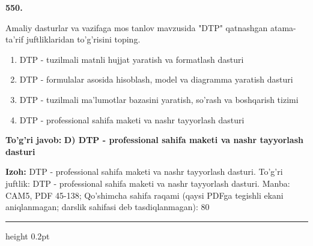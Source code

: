 \documentclass[10pt,a4paper]{article}
\begin{document}
{\bfseries\sffamily\color{ink} 550.}
\par
Amaliy dasturlar va vazifaga mos tanlov mavzusida "DTP" qatnashgan atama-ta'rif juftliklaridan to'g'risini toping.
\begin{enumerate}[label=\Alph*),leftmargin=9mm]
\item DTP - tuzilmali matnli hujjat yaratish va formatlash dasturi
\item DTP - formulalar asosida hisoblash, model va diagramma yaratish dasturi
\item DTP - tuzilmali ma'lumotlar bazasini yaratish, so'rash va boshqarish tizimi
\item DTP - professional sahifa maketi va nashr tayyorlash dasturi
\end{enumerate}
\begin{tcolorbox}[enhanced,breakable,colback=teal!4,colframe=teal!60!black,boxrule=0.45pt,arc=1.2mm,left=2.7mm,right=2.7mm,top=1.8mm,bottom=1.8mm,before skip=2mm,after skip=2mm]
{\bfseries\sffamily\color{teal}To'g'ri javob:} \textbf{D) DTP - professional sahifa maketi va nashr tayyorlash dasturi}
\par\smallskip
{\bfseries Izoh:} DTP - professional sahifa maketi va nashr tayyorlash dasturi. To'g'ri juftlik: DTP - professional sahifa maketi va nashr tayyorlash dasturi. Manba: CAM5, PDF 45-138; Qo'shimcha sahifa raqami (qaysi PDFga tegishli ekani aniqlanmagan; darslik sahifasi deb tasdiqlanmagan): 80
\end{tcolorbox}
\vspace{2mm}\hrule height 0.2pt\vspace{3mm}
\end{document}
